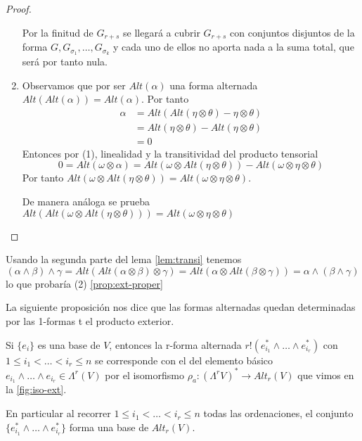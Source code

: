 \documentclass[../VD.tex]{subfiles}
\begin{document}
\begin{proof}
\begin{enumerate}
Por la finitud de \( G_{r+s} \) se llegará a cubrir \( G_{r+s} \) con conjuntos disjuntos de la forma \( G, G_{\sigma_1},\ldots,G_{\sigma_k} \) y cada uno de ellos no aporta nada a la suma total, que será por tanto nula.
\item Observamos que por ser \( Alt(\alpha) \) una forma alternada \( Alt(Alt(\alpha))=Alt(\alpha) \). Por tanto
\begin{align*}
\alpha&=Alt(Alt(\eta\otimes\theta)-\eta\otimes\theta)\\
&=Alt(\eta\otimes\theta)-Alt(\eta\otimes\theta)\\
&=0
\end{align*}
Entonces por (1), linealidad y la transitividad del producto tensorial
\[
0=Alt(\omega\otimes\alpha)=Alt(\omega\otimes Alt(\eta\otimes\theta))-Alt(\omega\otimes\eta\otimes\theta)
\]
Por tanto \( Alt(\omega\otimes Alt(\eta\otimes\theta))=Alt(\omega\otimes\eta\otimes\theta) \).

De manera análoga se prueba \( Alt(Alt(\omega\otimes Alt(\eta\otimes\theta)))=Alt(\omega\otimes\eta\otimes\theta) \)
\end{enumerate}
\end{proof}

\begin{note}
Usando la segunda parte del lema \ref{lem:transi} tenemos
\[
(\alpha\wedge\beta)\wedge\gamma=Alt(Alt(\alpha\otimes\beta)\otimes\gamma)=
Alt(\alpha\otimes Alt(\beta\otimes\gamma))=\alpha\wedge(\beta\wedge\gamma)
\]
lo que probaría (2) \ref{prop:ext-proper}
\end{note}

La siguiente proposición nos dice que las formas alternadas quedan determinadas por las 1-formas t el producto exterior.

\begin{proposition}\label{prop:base-alt}
Si \( \{e_i\} \) es una base de \( V \), entonces la r-forma alternada \(
r!(e_{i_1}^*\wedge\ldots\wedge e_{i_r}^*) \) con \( 1\leq i_1< \ldots<i_r\leq n
\) se corresponde con el del elemento básico \( e_{i_1}\wedge\ldots \wedge
e_{i_r}\in \Lambda^r(V) \)  por el isomorfismo \( \rho_a\colon(\Lambda^rV)^*\to
Alt_r(V)  \) que vimos en la \cref{fig:iso-ext}.

En particular al recorrer  \( 1\leq i_1< \ldots<i_r\leq n  \) todas las
ordenaciones, el conjunto \( \{e_{i_1}^*\wedge\ldots\wedge e_{i_r}^*\}\) forma
una base de \( Alt_r(V) \).
\end{proposition}
\end{document}
